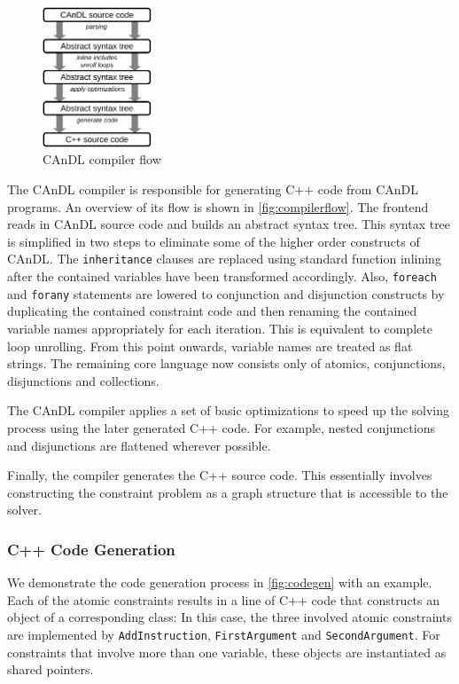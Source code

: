 \begin{figure}[t]
\centering
\includegraphics[width=0.29\textwidth]{figures/candlstages.pdf}
\caption{CAnDL compiler flow}
\label{fig:compilerflow}
\end{figure}

    The CAnDL compiler is responsible for generating C++ code from CAnDL
    programs.
    An overview of its  flow is shown in \autoref{fig:compilerflow}.
    The frontend reads in  CAnDL source code and builds an abstract syntax tree.
    This syntax tree is simplified in two steps to eliminate some of the higher
    order constructs of CAnDL.
    The \texttt{inheritance} clauses are replaced using standard function
    inlining after the contained variables have been transformed accordingly.
    Also, \texttt{foreach} and \texttt{forany} statements are lowered to
    conjunction and disjunction constructs by duplicating the contained constraint code
    and then renaming the contained variable names appropriately for each
    iteration. This is equivalent to complete loop unrolling.
    From this point onwards, variable names are treated as flat strings.
    The remaining core language now consists only of atomics, conjunctions,
    disjunctions and collections.

    The CAnDL compiler applies a set of basic optimizations to speed up the
    solving process using the later generated C++ code.
    For example, nested conjunctions and disjunctions are flattened wherever
    possible.

    Finally, the compiler generates the C++ source code.
    This essentially involves constructing the constraint problem as a graph
    structure that is accessible to the solver.

\subsubsection{C++ Code Generation}

    We demonstrate the code generation process in \autoref{fig:codegen} with an
    example.
    Each of the atomic constraints results in a line of C++ code that constructs
    an object of a corresponding class:
    In this case, the three involved atomic constraints are implemented by
    \texttt{AddInstruction}, \texttt{FirstArgument} and \texttt{SecondArgument}.
    For constraints that involve more than one variable, these objects are
    instantiated as shared pointers.

